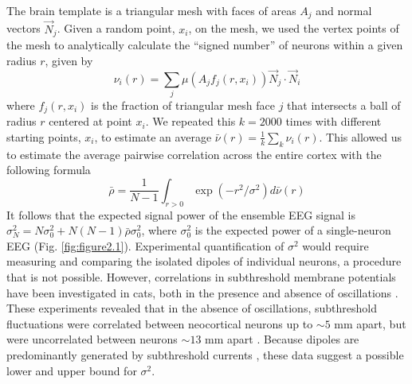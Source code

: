 The brain template is a triangular mesh with faces of areas $A_j$ and normal vectors ${\vec{N}}_j$. Given a random point, $x_i$, on the mesh, we used the vertex points of the mesh to analytically calculate the “signed number” of neurons within a given radius $r$, given by 
\begin{equation}
\nu_i\left(r\right)=\sum_{j}{\mu\left(A_jf_j\left(r,x_i\right)\right){\vec{N}}_j\cdot{\vec{N}}_i}
\end{equation}
where $f_j\left(r,x_i\right)$ is the fraction of triangular mesh face $j$ that intersects a ball of radius $r$ centered at point $x_i$. We repeated this $k=2000$ times with different starting points, $x_i$, to estimate an average $\bar{\nu}\left(r\right)=\frac{1}{k}\sum_{k}{\nu_i(r)}$. This allowed us to estimate the average pairwise correlation across the entire cortex with the following formula 
\begin{equation}
\bar{\rho}=\frac{1}{N-1}\int_{r>0}{\exp{\left(-r^2/\sigma^2\right)}d\bar{\nu}\left(r\right)}
\end{equation}
It follows that the expected signal power of the ensemble EEG signal is $\sigma_N^2=N\sigma_0^2+N\left(N-1\right)\bar{\rho}\sigma_0^2$, where $\sigma_0^2$ is the expected power of a single-neuron EEG (Fig. \ref{fig:figure2.1}).
Experimental quantification of $\sigma^2$ would require measuring and comparing the isolated dipoles of individual neurons, a procedure that is not possible. However, correlations in subthreshold membrane potentials have been investigated in cats, both in the presence and absence of oscillations \cite{Volgushev2011}. These experiments revealed that in the absence of oscillations, subthreshold fluctuations were correlated between neocortical neurons up to ${\sim}5$ mm apart, but were uncorrelated between neurons ${\sim}13$ \unit{\milli\meter} apart \cite{Volgushev2011}. Because dipoles are predominantly generated by subthreshold currents \cite{Buzsaki2012, Einevoll2013}, these data suggest a possible lower and upper bound for $\sigma^2$.

